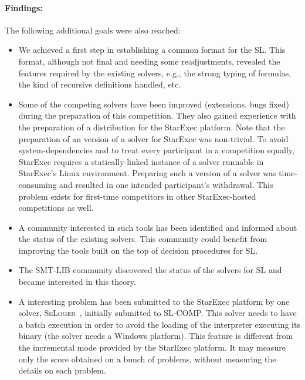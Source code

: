 \documentclass[twoside,11pt]{article}
\begin{document}
\paragraph{Findings:}
The following additional goals were also reached:
\begin{itemize}
\item We achieved a first step in establishing a common format for the SL. 
This format, although not final and needing some readjustments, revealed the features required by the existing solvers, e.g., the strong typing of formulas, the kind of recursive definitions handled, etc.

\item Some of the competing solvers have been improved (extensions, bugs fixed) during the preparation of this competition. They also gained experience with the preparation of a distribution for the StarExec platform. Note that the preparation of an version of a solver for StarExec was non-trivial. To avoid system-dependencies and to treat every participant in a competition equally, StarExec requires a 
statically-linked instance of a solver runnable in StarExec's Linux environment. Preparing such a version
of a solver was time-consuming and resulted in one intended participant's withdrawal. This problem
exists for first-time competitors in other StarExec-hosted competitions as well.

\item A community interested in such tools has been identified and informed about the status of the existing solvers. This community could benefit from improving the tools built on the top of decision procedures for SL.

\item The SMT-LIB community discovered the status of the solvers for SL and became interested in this theory.

\item A interesting problem has been submitted to the StarExec platform by one solver, \textsc{SeLoger}~\cite{HasseIOP13}, initially submitted to SL-COMP. This solver needs to have a batch execution in order to avoid the loading of the interpreter executing its binary (the solver needs a Windows platform).
This feature is different from the incremental mode provided by the StarExec platform. It may measure only the score obtained on a bunch of problems, without measuring the details on each problem. 
 
\end{itemize}
\end{document}
